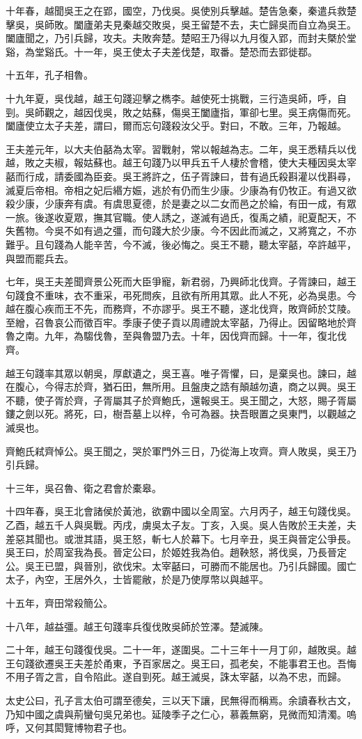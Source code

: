 十年春，越聞吳王之在郢，國空，乃伐吳。吳使別兵擊越。楚告急秦，秦遣兵救楚擊吳，吳師敗。闔廬弟夫見秦越交敗吳，吳王留楚不去，夫亡歸吳而自立為吳王。闔廬聞之，乃引兵歸，攻夫。夫敗奔楚。楚昭王乃得以九月復入郢，而封夫槩於堂谿，為堂谿氏。十一年，吳王使太子夫差伐楚，取番。楚恐而去郢徙鄀。

十五年，孔子相魯。

十九年夏，吳伐越，越王句踐迎擊之檇李。越使死士挑戰，三行造吳師，呼，自剄。吳師觀之，越因伐吳，敗之姑蘇，傷吳王闔廬指，軍卻七里。吳王病傷而死。闔廬使立太子夫差，謂曰，爾而忘句踐殺汝父乎。對曰，不敢。三年，乃報越。

王夫差元年，以大夫伯嚭為太宰。習戰射，常以報越為志。二年，吳王悉精兵以伐越，敗之夫椒，報姑蘇也。越王句踐乃以甲兵五千人棲於會稽，使大夫種因吳太宰嚭而行成，請委國為臣妾。吳王將許之，伍子胥諫曰，昔有過氏殺斟灌以伐斟尋，滅夏后帝相。帝相之妃后緡方娠，逃於有仍而生少康。少康為有仍牧正。有過又欲殺少康，少康奔有虞。有虞思夏德，於是妻之以二女而邑之於綸，有田一成，有眾一旅。後遂收夏眾，撫其官職。使人誘之，遂滅有過氏，復禹之績，祀夏配天，不失舊物。今吳不如有過之彊，而句踐大於少康。今不因此而滅之，又將寬之，不亦難乎。且句踐為人能辛苦，今不滅，後必悔之。吳王不聽，聽太宰嚭，卒許越平，與盟而罷兵去。

七年，吳王夫差聞齊景公死而大臣爭寵，新君弱，乃興師北伐齊。子胥諫曰，越王句踐食不重味，衣不重采，弔死問疾，且欲有所用其眾。此人不死，必為吳患。今越在腹心疾而王不先，而務齊，不亦謬乎。吳王不聽，遂北伐齊，敗齊師於艾陵。至繒，召魯哀公而徵百牢。季康子使子貢以周禮說太宰嚭，乃得止。因留略地於齊魯之南。九年，為騶伐魯，至與魯盟乃去。十年，因伐齊而歸。十一年，復北伐齊。

越王句踐率其眾以朝吳，厚獻遺之，吳王喜。唯子胥懼，曰，是棄吳也。諫曰，越在腹心，今得志於齊，猶石田，無所用。且盤庚之誥有顛越勿遺，商之以興。吳王不聽，使子胥於齊，子胥屬其子於齊鮑氏，還報吳王。吳王聞之，大怒，賜子胥屬鏤之劍以死。將死，曰，樹吾墓上以梓，令可為器。抉吾眼置之吳東門，以觀越之滅吳也。

齊鮑氏弒齊悼公。吳王聞之，哭於軍門外三日，乃從海上攻齊。齊人敗吳，吳王乃引兵歸。

十三年，吳召魯、衛之君會於橐皋。

十四年春，吳王北會諸侯於黃池，欲霸中國以全周室。六月丙子，越王句踐伐吳。乙酉，越五千人與吳戰。丙戌，虜吳太子友。丁亥，入吳。吳人告敗於王夫差，夫差惡其聞也。或泄其語，吳王怒，斬七人於幕下。七月辛丑，吳王與晉定公爭長。吳王曰，於周室我為長。晉定公曰，於姬姓我為伯。趙鞅怒，將伐吳，乃長晉定公。吳王已盟，與晉別，欲伐宋。太宰嚭曰，可勝而不能居也。乃引兵歸國。國亡太子，內空，王居外久，士皆罷敝，於是乃使厚幣以與越平。

十五年，齊田常殺簡公。

十八年，越益彊。越王句踐率兵復伐敗吳師於笠澤。楚滅陳。

二十年，越王句踐復伐吳。二十一年，遂圍吳。二十三年十一月丁卯，越敗吳。越王句踐欲遷吳王夫差於甬東，予百家居之。吳王曰，孤老矣，不能事君王也。吾悔不用子胥之言，自令陷此。遂自剄死。越王滅吳，誅太宰嚭，以為不忠，而歸。

太史公曰，孔子言太伯可謂至德矣，三以天下讓，民無得而稱焉。余讀春秋古文，乃知中國之虞與荊蠻句吳兄弟也。延陵季子之仁心，慕義無窮，見微而知清濁。嗚呼，又何其閎覽博物君子也。